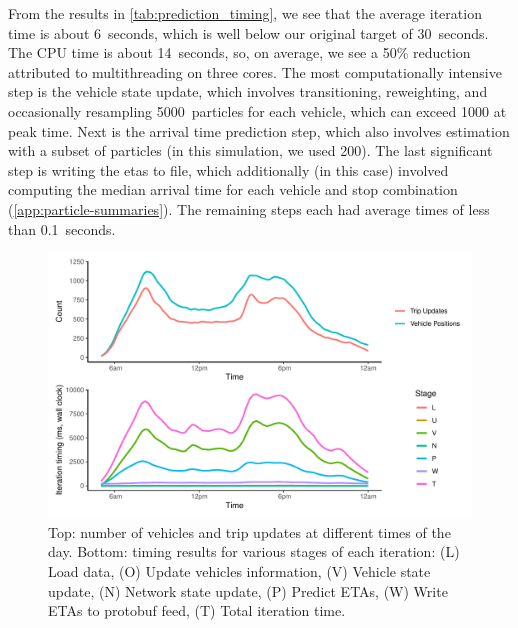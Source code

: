 From the results in \cref{tab:prediction_timing}, we see that the average iteration time is about 6~seconds, which is well below our original target of 30~seconds. The CPU time is about 14~seconds, so, on average, we see a 50\% reduction attributed to multithreading on three cores. The most computationally intensive step is the vehicle state update, which involves transitioning, reweighting, and occasionally resampling 5000~particles for each vehicle, which can exceed 1000 at peak time. Next is the arrival time prediction step, which also involves estimation with a subset of particles (in this simulation, we used 200). The last significant step is writing the \glspl{eta} to file, which additionally (in this case) involved computing the median arrival time for each vehicle and stop combination (\cref{app:particle-summaries}). The remaining steps each had average times of less than 0.1~seconds.



\begin{knitrout}\small
{}\color{fgcolor}\begin{figure}

{\centering \includegraphics[width=\textwidth]{figure/prediction_timing_time-1} 

}

\caption[Number of vehicles and iteration timings over the course of a day.]{Top: number of vehicles and trip updates at different times of the day. Bottom: timing results for various stages of each iteration: (L) Load data, (O) Update vehicles information, (V) Vehicle state update, (N) Network state update, (P) Predict ETAs, (W) Write ETAs to protobuf feed, (T) Total iteration time.}\label{fig:prediction_timing_time}
\end{figure}


\end{knitrout}



